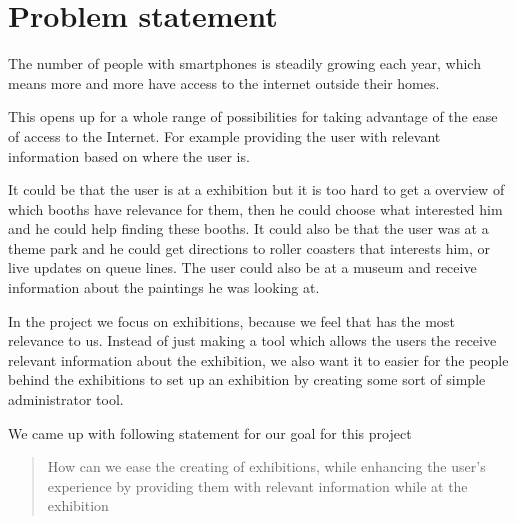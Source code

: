 \section*{Problem statement}

The number of people with smartphones is steadily growing each year, which means more and more have access to the internet outside their homes.

This opens up for a whole range of possibilities for taking advantage of the ease of access to the Internet. For example providing the user with relevant information based on where the user is. 

It could be that the user is at a exhibition but it is too hard to get a overview of which booths have relevance for them, then he could choose what interested him and he could help finding these booths. It could also be that the user was at a theme park and he could get directions to roller coasters that interests him, or live updates on queue lines. The user could also be at a museum and receive information about the paintings he was looking at.  

In the project we focus on exhibitions, because we feel that has the most relevance to us. Instead of just making a tool which allows the users the receive relevant information about the exhibition, we also want it to easier for the people behind the exhibitions to set up an exhibition by creating some sort of simple administrator tool.

We came up with following statement for our goal for this project 

\begin{quote}
How can we ease the creating of exhibitions, while enhancing the user's experience by providing them with relevant information while at the exhibition
\end{quote}

